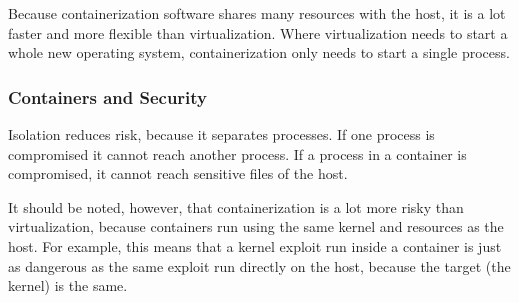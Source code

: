 
Because containerization software shares many resources with the host, it is a lot faster and more flexible than virtualization. Where virtualization needs to start a whole new operating system, containerization only needs to start a single process.

\subsubsection{Containers and Security}

Isolation reduces risk, because it separates processes. If one process is compromised it cannot reach another process. If a process in a container is compromised, it cannot reach sensitive files of the host.

\hfill

It should be noted, however, that containerization is a lot more risky than virtualization, because containers run using the same kernel and resources as the host. For example, this means that a kernel exploit run inside a container is just as dangerous as the same exploit run directly on the host, because the target (the kernel) is the same.
